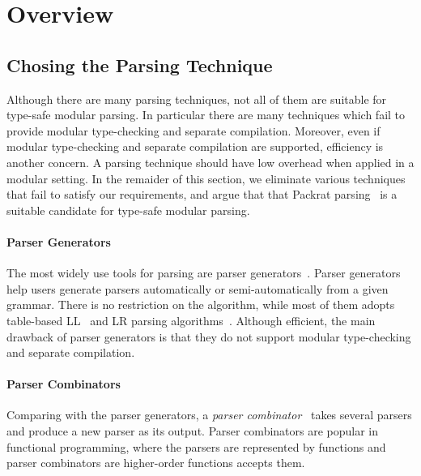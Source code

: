 \section{Overview}\label{sec:overview}

\subsection{Chosing the Parsing Technique}\label{subsec:overview-parsing}


Although there are many parsing techniques, not all of them are
suitable for type-safe modular parsing. In particular there are many 
techniques which fail to provide modular type-checking and separate 
compilation. Moreover, even if modular type-checking and separate 
compilation are supported, efficiency is another
concern. A parsing technique should have low overhead when applied 
in a modular setting. In the remaider of this section, we eliminate 
various techniques that fail to satisfy our requirements, and argue
that that Packrat parsing~\cite{} is a suitable candidate for
type-safe modular parsing.

\paragraph{Parser Generators} The most widely use tools for parsing 
are parser generators~\cite{}. Parser generators help users generate parsers automatically or
semi-automatically from a given grammar. There is no restriction on
the algorithm, while most of them adopts table-based LL~\cite{} and LR parsing
algorithms~\cite{}. 
Although efficient, the main drawback of parser generators is that they do not support 
modular type-checking and separate compilation.


\paragraph{Parser Combinators}
Comparing with the parser generators, a \textit{parser combinator}~\cite{}
takes several parsers and produce a new parser as its output. Parser combinators are
popular in functional programming, where the parsers are represented
by functions and parser combinators are higher-order functions accepts
them.

